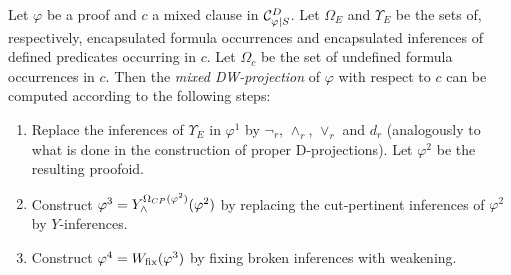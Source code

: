 \documentclass{llncs}
\begin{document}
\begin{definition}
\label{definition:DWProjectionMixed}
Let $\varphi$ be a proof and $c$ a mixed clause in $\mathcal{C}^{D}_{\varphi|S}$. Let $\Omega_E$ and $\Upsilon_E$ be the sets of, respectively, encapsulated formula occurrences and encapsulated inferences of defined predicates occurring in $c$. Let $\Omega_c$ be the set of undefined formula occurrences in $c$. Then the \emph{mixed DW-projection} of $\varphi$ with respect to $c$ can be computed according to the following steps:

\begin{enumerate}
\item Replace the inferences of $\Upsilon_E$ in $\varphi^1$ by $\neg_r$, $\wedge_r$, $\vee_r$ and $d_r$ (analogously to what is done in the construction of proper D-projections). Let $\varphi^2$ be the resulting proofoid.
\item Construct $\varphi^3 = Y_{\wedge}^{\Omega_{CP}(\varphi^2)}(\varphi^2)$ by replacing the cut-pertinent inferences of $\varphi^2$ by $Y$-inferences.
\item Construct $\varphi^4 = W_{\mathrm{fix}}(\varphi^3)$ by fixing broken inferences with weakening.
\end{enumerate}
\end{definition}
\end{document}
